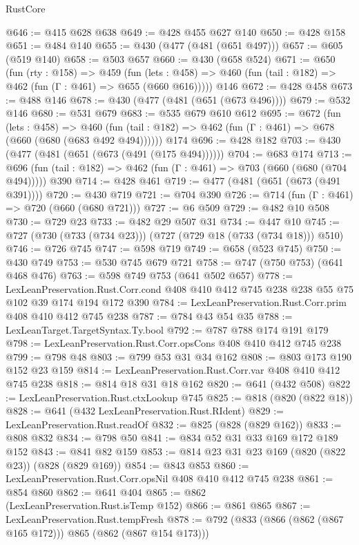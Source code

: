 \begin{lexlean}{RustCore}
\begin{coremodule}
@646 := @415 @628 @638
@649 := @428 @455 @627 @140
@650 := @428 @158
@651 := @484 @140
@655 := @430 (@477 (@481 (@651 @497)))
@657 := @605 (@519 @140)
@658 := @503 @657
@660 := @430 (@658 @524)
@671 := @650
    (fun (rty : @158) =>
    @459
      (fun (lets : @458) => @460 (fun (tail : @182) => @462 (fun (Γ : @461) => @655 (@660 @616)))))
    @146
@672 := @428 @458
@673 := @488 @146
@678 := @430 (@477 (@481 (@651 (@673 @496))))
@679 := @532 @146
@680 := @531 @679
@683 := @535 @679 @610 @612
@695 := @672
    (fun (lets : @458) =>
    @460 (fun (tail : @182) => @462 (fun (Γ : @461) => @678 (@660 (@680 (@683 @492 @494))))))
    @174
@696 := @428 @182
@703 := @430 (@477 (@481 (@651 (@673 (@491 (@175 @494))))))
@704 := @683 @174
@713 := @696 (fun (tail : @182) => @462 (fun (Γ : @461) => @703 (@660 (@680 (@704 @494))))) @390
@714 := @428 @461
@719 := @477 (@481 (@651 (@673 (@491 @391))))
@720 := @430 @719
@721 := @704 @390
@726 := @714 (fun (Γ : @461) => @720 (@660 (@680 @721)))
@727 := @6 @509
@729 := @482 @10 @508
@730 := @729 @23
@733 := @482 @29 @507 @31
@734 := @447 @10
@745 := @727 (@730 (@733 (@734 @23))) (@727 (@729 @18 (@733 (@734 @18))) @510)
@746 := @726 @745
@747 := @598 @719
@749 := @658 (@523 @745)
@750 := @430 @749
@753 := @530 @745 @679 @721
@758 := @747 (@750 @753) (@641 @468 @476)
@763 := @598 @749 @753 (@641 @502 @657)
@778 := LexLeanPreservation.Rust.Corr.cond
    @408
    @410
    @412
    @745
    @238
    @238
    @55
    @75
    @102
    @39
    @174
    @194
    @172
    @390
@784 := LexLeanPreservation.Rust.Corr.prim @408 @410 @412 @745 @238
@787 := @784 @43 @54 @35
@788 := LexLeanTarget.TargetSyntax.Ty.bool
@792 := @787 @788 @174 @191 @179
@798 := LexLeanPreservation.Rust.Corr.opsCons @408 @410 @412 @745 @238
@799 := @798 @48
@803 := @799 @53 @31 @34 @162
@808 := @803 @173 @190 @152 @23 @159
@814 := LexLeanPreservation.Rust.Corr.var @408 @410 @412 @745 @238
@818 := @814 @18 @31 @18 @162
@820 := @641 (@432 @508)
@822 := LexLeanPreservation.Rust.ctxLookup @745
@825 := @818 (@820 (@822 @18))
@828 := @641 (@432 LexLeanPreservation.Rust.RIdent)
@829 := LexLeanPreservation.Rust.readOf
@832 := @825 (@828 (@829 @162))
@833 := @808 @832
@834 := @798 @50
@841 := @834 @52 @31 @33 @169 @172 @189 @152
@843 := @841 @82 @159
@853 := @814 @23 @31 @23 @169 (@820 (@822 @23)) (@828 (@829 @169))
@854 := @843 @853
@860 := LexLeanPreservation.Rust.Corr.opsNil @408 @410 @412 @745 @238
@861 := @854 @860
@862 := @641 @404
@865 := @862 (LexLeanPreservation.Rust.isTemp @152)
@866 := @861 @865
@867 := LexLeanPreservation.Rust.tempFresh
@878 := @792 (@833 (@866 (@862 (@867 @165 @172))) @865 (@862 (@867 @154 @173)))

\end{coremodule}
\end{lexlean}
